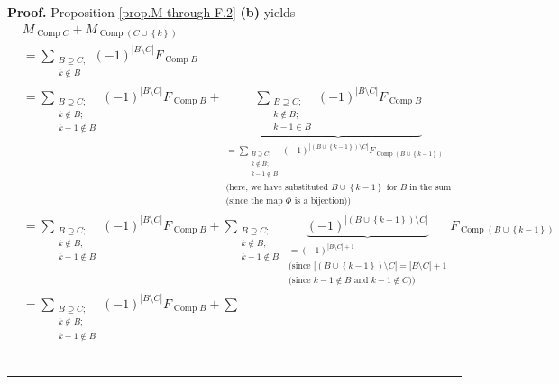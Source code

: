 \documentclass[numbers=enddot,12pt,final,onecolumn,notitlepage]{scrartcl}%
\theoremstyle{definition}
\newenvironment{proof}[1][Proof]{\noindent\textbf{#1.} }{\ \rule{0.5em}{0.5em}}
\newenvironment{verlong}{}{}
\let\sumnonlimits\sum
\renewcommand{\sum}{\sumnonlimits\limits}
\begin{document}
\begin{verlong}
\begin{proof}
Proposition \ref{prop.M-through-F.2} \textbf{(b)} yields
\begin{align*}
&  M_{\operatorname*{Comp}C}+M_{\operatorname*{Comp}\left(  C\cup\left\{
k\right\}  \right)  }\\
&  =\sum_{\substack{B\supseteq C;\\k\notin B}}\left(  -1\right)  ^{\left\vert
B\setminus C\right\vert }F_{\operatorname*{Comp}B}\\
&  =\sum_{\substack{B\supseteq C;\\k\notin B;\\k-1\notin B}}\left(  -1\right)
^{\left\vert B\setminus C\right\vert }F_{\operatorname*{Comp}B}%
+\underbrace{\sum_{\substack{B\supseteq C;\\k\notin B;\\k-1\in B}}\left(
-1\right)  ^{\left\vert B\setminus C\right\vert }F_{\operatorname*{Comp}B}%
}_{\substack{=\sum_{\substack{B\supseteq C;\\k\notin B;\\k-1\notin B}}\left(
-1\right)  ^{\left\vert \left(  B\cup\left\{  k-1\right\}  \right)  \setminus
C\right\vert }F_{\operatorname*{Comp}\left(  B\cup\left\{  k-1\right\}
\right)  }\\\text{(here, we have substituted }B\cup\left\{  k-1\right\}
\text{ for }B\text{ in the sum}\\\text{(since the map }\Phi\text{ is a
bijection))}}}\\
&  =\sum_{\substack{B\supseteq C;\\k\notin B;\\k-1\notin B}}\left(  -1\right)
^{\left\vert B\setminus C\right\vert }F_{\operatorname*{Comp}B}+\sum
_{\substack{B\supseteq C;\\k\notin B;\\k-1\notin B}}\underbrace{\left(
-1\right)  ^{\left\vert \left(  B\cup\left\{  k-1\right\}  \right)  \setminus
C\right\vert }}_{\substack{=\left(  -1\right)  ^{\left\vert B\setminus
C\right\vert +1}\\\text{(since }\left\vert \left(  B\cup\left\{  k-1\right\}
\right)  \setminus C\right\vert =\left\vert B\setminus C\right\vert
+1\\\text{(since }k-1\notin B\text{ and }k-1\notin C\text{))}}%
}F_{\operatorname*{Comp}\left(  B\cup\left\{  k-1\right\}  \right)  }\\
&  =\sum_{\substack{B\supseteq C;\\k\notin B;\\k-1\notin B}}\left(  -1\right)
^{\left\vert B\setminus C\right\vert }F_{\operatorname*{Comp}B}+\sum

\end{align*}
\end{proof}
\end{verlong}
\end{document}
